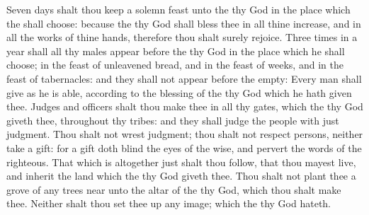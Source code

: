 \begin{biblechapter}
\verse Seven days shalt thou keep a solemn feast unto the \LORD thy God in the place which the \LORD shall choose: because the \LORD thy God shall bless thee in all thine increase, and in all the works of thine hands, therefore thou shalt surely rejoice.
\verse Three times in a year shall all thy males appear before the \LORD thy God in the place which he shall choose; in the feast of unleavened bread, and in the feast of weeks, and in the feast of tabernacles: and they shall not appear before the \LORD empty:
\verse Every man shall give as he is able, according to the blessing of the \LORD thy God which he hath given thee.
 Judges and officers shalt thou make thee in all thy gates, which the \LORD thy God giveth thee, throughout thy tribes: and they shall judge the people with just judgment.
\verse Thou shalt not wrest judgment; thou shalt not respect persons, neither take a gift: for a gift doth blind the eyes of the wise, and pervert the words of the righteous.
\verse That which is altogether just shalt thou follow, that thou mayest live, and inherit the land which the \LORD thy God giveth thee.
 Thou shalt not plant thee a grove of any trees near unto the altar of the \LORD thy God, which thou shalt make thee.
\verse Neither shalt thou set thee up any image; which the \LORD thy God hateth.
\end{biblechapter}

